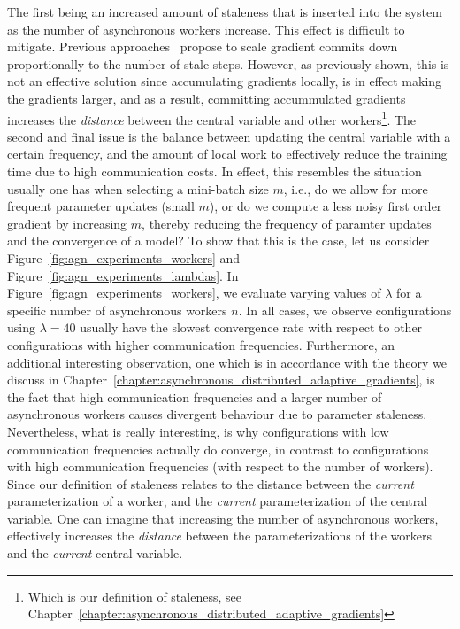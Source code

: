 The first being an increased amount of staleness that is inserted into the system as the number of asynchronous workers increase. This effect is difficult to mitigate. Previous approaches~\cite{jiang2017heterogeneity} propose to scale gradient commits down proportionally to the number of stale steps. However, as previously shown, this is not an effective solution since accumulating gradients locally, is in effect making the gradients larger, and as a result, committing accummulated gradients increases the \emph{distance} between the central variable and other workers\footnote{Which is our definition of staleness, see Chapter~\ref{chapter:asynchronous_distributed_adaptive_gradients}}. The second and final issue is the balance between updating the central variable with a certain frequency, and the amount of local work to effectively reduce the training time due to high communication costs. In effect, this resembles the situation usually one has when selecting a mini-batch size $m$, i.e., do we allow for more frequent parameter updates (small $m$), or do we compute a less noisy first order gradient by increasing $m$, thereby reducing the frequency of paramter updates and the convergence of a model? To show that this is the case, let us consider Figure~\ref{fig:agn_experiments_workers} and Figure~\ref{fig:agn_experiments_lambdas}. In Figure~\ref{fig:agn_experiments_workers}, we evaluate varying values of $\lambda$ for a specific number of asynchronous workers $n$. In all cases, we observe configurations using $\lambda = 40$ usually have the slowest convergence rate with respect to other configurations with higher communication frequencies. Furthermore, an additional interesting observation, one which is in accordance with the theory we discuss in Chapter~\ref{chapter:asynchronous_distributed_adaptive_gradients}, is the fact that high communication frequencies and a larger number of asynchronous workers causes divergent behaviour due to parameter staleness. Nevertheless, what is really interesting, is why configurations with low communication frequencies actually do converge, in contrast to configurations with high communication frequencies (with respect to the number of workers). Since our definition of staleness relates to the distance between the \emph{current} parameterization of a worker, and the \emph{current} parameterization of the central variable. One can imagine that increasing the number of asynchronous workers, effectively increases the \emph{distance} between the parameterizations of the workers and the \emph{current} central variable.

